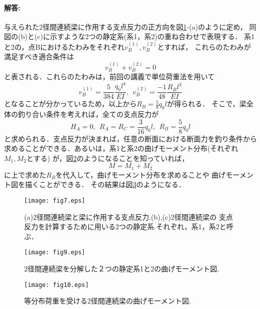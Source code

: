 ﻿\documentclass[10pt,a4j]{jarticle}
\begin{document}
\paragraph{解答:}
与えられた2径間連続梁に作用する支点反力の正方向を図\ref{fig:fig2_7}-(a)のように定め，
同図の(b)と(c)に示すような2つの静定系(系1，系2)の重ね合わせで表現する．
系1と2の，点Bにおけるたわみをそれぞれ$v_B^{(1)},v_B^{(2)}$とすれば，
これらのたわみが満足すべき適合条件は
\begin{equation}
	v_B^{(1)} + v_B^{(2)}=0
	\label{eqn:vb_vanish}
\end{equation}
と表される．これらのたわみは，前回の講義で単位荷重法を用いて
\begin{equation}
	v_B^{(1)}=
	\frac{5}{384} \frac{q_0l^4}{EI}, \ \ 
	 v_B^{(2)}=
	\frac{-1}{48} \frac{R_Bl^3}{EI}
	\label{eqn:}
\end{equation}
となることが分かっているため，以上から$R_B=\frac{5}{8}q_0l$が得られる．
そこで，梁全体の釣り合い条件を考えれば，全ての支点反力が
\begin{equation}
	H_A=0, \ \ R_A=R_C=\frac{3}{16}q_0l, \ \ R_B=\frac{5}{8}q_0l
	\label{eqn:}
\end{equation}
と求められる．支点反力が決まれば，任意の断面における断面力を釣り条件から求めることができる．あるいは，系1と系2の曲げモーメント分布(それぞれ$M_1, M_2$とする)
が，図\ref{fig:fig9}のようになることを知っていれば，
\begin{equation}
	M=M_1+M_2
	\label{eqn:}
\end{equation}
に上で求めた$R_B$を代入して，曲げモーメント分布を求めることや
曲げモーメント図を描くことができる．
その結果は図\ref{fig:fig10}のようになる．
\begin{figure}
	\begin{center}
	\texttt{[image: fig7.eps]} 
	\end{center}
	\caption{(a)2径間連続梁と梁に作用する支点反力.(b),(c)2径間連続梁の
	支点反力を計算するために用いる2つの静定系.それぞれ，系1，系2と呼ぶ．} 
	\label{fig:fig2_7}
\end{figure}
\begin{figure}[h]
	\begin{center}
	\texttt{[image: fig9.eps]} 
	\end{center}
	\caption{2径間連続梁を分解した２つの静定系1と2の曲げモーメント図.} 
	\label{fig:fig9}
\end{figure}
\begin{figure}[h]
	\begin{center}
	\texttt{[image: fig10.eps]} 
	\end{center}
	\caption{等分布荷重を受ける2径間連続梁の曲げモーメント図.} 
	\label{fig:fig10}
\end{figure}
\end{document}
